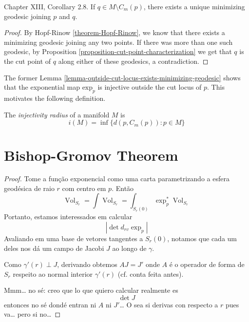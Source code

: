 \begin{lemma}
\label{lemma-outside-cut-locus-exists-minimizing-geodesic}
\cite{doc} Chapter XIII, Corollary 2.8. If $q \in M\setminus C_m(p)$, there exists a
 unique minimizing geodesic joining
$p$ and $q$.
\end{lemma}

\begin{proof}
By Hopf-Rinow \ref{theorem-Hopf-Rinow}, we know that
there exists a minimizing geodesic joining any two points. If there was more
than one such geodesic, by 
Proposition \ref{proposition-cut-point-characterization} 
we get that $q$ is the cut point of  $q$ along either of these geodesics, 
a contradiction.
\end{proof}

The former Lemma \ref{lemma-outside-cut-locus-exists-minimizing-geodesic} 
shows that the exponential map $\text{exp}_p$
 is injective outside the cut locus of $p$. 
This motivates the following definition.

\begin{definition}
\label{definition-injectivity-radius}
The {\it injectivity radius} of a manifold $M$ is
$$
i(M)=\operatorname{inf}\{d(p,C_m(p)):p \in M\}
$$
\end{definition}

\section{Bishop-Gromov Theorem}
\label{section-bishop-gromov}

\begin{theorem}
\label{theorem-bishop-gromov}

\end{theorem}

\begin{proof}
Tome a função exponencial como uma carta parametrizando a esfera geodésica de
raio $r$ com centro em $p$. Então
$$
\operatorname{Vol}_{S_r}=\int
\operatorname{Vol}_{S_r}=
\int_{S_r(0)}\operatorname{exp}_p^*\operatorname{Vol}_{S_r}
$$
Portanto, estamos interessados em calcular 
$$
|\det d_{rv} \operatorname{exp}_p|
$$
Avaliando em uma base de vetores tangentes a $S_r(0)$, notamos que cada um deles
nos dá um campo de Jacobi $J$ ao longo de $\gamma$.

Como $\gamma'(r)\perp J$, derivando obtemos $A J=J'$ onde $A$ é o operador de
forma de $S_r$ respeito ao normal interior $\gamma'(r)$ (cf. conta feita antes).

Mmm… no sé: creo que lo que quiero calcular realmente es
$$
\det J
$$
entonces no sé dondé entran ni $A$ ni $J'$… O sea si derivas con respecto a $r$
pues va… pero si no…

\end{proof}

